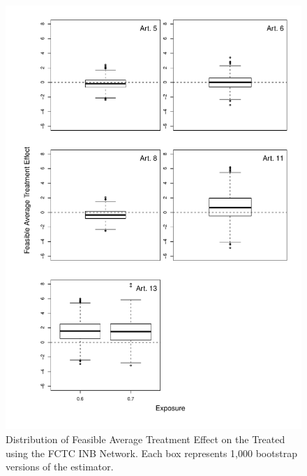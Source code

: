 \documentclass[10pt]{article}
\begin{document}
\begin{figure}[H]
	\centering
	\includegraphics[width=.8\linewidth]{../fig/matching_bloxplot_inb.pdf}
	\caption{Distribution of Feasible Average Treatment Effect on the Treated using the FCTC INB Network. Each box represents 1,000 bootstrap versions of the estimator.}
\end{figure}
\end{document}
